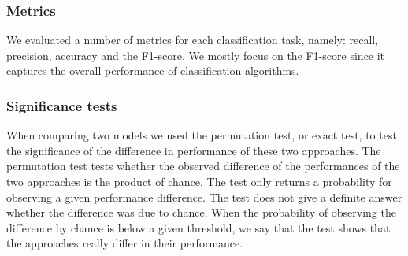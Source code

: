 
\subsubsection{Metrics}
We evaluated a number of metrics for each classification task, namely: 
recall, precision, accuracy and the F1-score. We mostly focus on the F1-score since it captures the overall performance of classification algorithms.

\subsubsection{Significance tests}
When comparing two models we used the permutation test, or exact test, to test the significance of the difference in performance of these two approaches.
The permutation test tests whether the observed difference of the performances of the two approaches is the product of chance.
The test only returns a probability for observing a given performance difference. The test does not give a definite answer whether the difference was due to chance.
When the probability of observing the difference by chance is below a given threshold, we say that the test shows that the approaches really differ in their performance.


